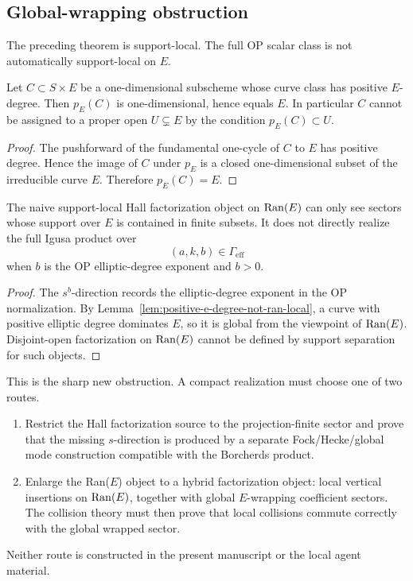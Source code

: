 \subsection{Global-wrapping obstruction}

The preceding theorem is support-local.  The full OP scalar class is not
automatically support-local on \(E\).

\begin{lemma}
\label{lem:positive-e-degree-not-ran-local}
Let \(C\subset S\times E\) be a one-dimensional subscheme whose curve
class has positive \(E\)-degree.  Then \(p_E(C)\) is one-dimensional,
hence equals \(E\).  In particular \(C\) cannot be assigned to a proper
open \(U\subsetneq E\) by the condition \(p_E(C)\subset U\).
\end{lemma}

\begin{proof}
The pushforward of the fundamental one-cycle of \(C\) to \(E\) has
positive degree.  Hence the image of \(C\) under \(p_E\) is a closed
one-dimensional subset of the irreducible curve \(E\).  Therefore
\(p_E(C)=E\).
\end{proof}

\begin{corollary}
\label{cor:ranE-misses-s-direction}
The naive support-local Hall factorization object on \(\operatorname{Ran}(E)\) can
only see sectors whose support over \(E\) is contained in finite
subsets.  It does not directly realize the full Igusa product over
\[
(a,k,b)\in\Gamma_{\mathrm{eff}}
\]
when \(b\) is the OP elliptic-degree exponent and \(b>0\).
\end{corollary}

\begin{proof}
The \(s^b\)-direction records the elliptic-degree exponent in the OP
normalization.  By Lemma~\ref{lem:positive-e-degree-not-ran-local}, a
curve with positive elliptic degree dominates \(E\), so it is global from
the viewpoint of \(\operatorname{Ran}(E)\).  Disjoint-open factorization on
\(\operatorname{Ran}(E)\) cannot be defined by support separation for such objects.
\end{proof}

This is the sharp new obstruction.  A compact realization must choose one
of two routes.
\begin{enumerate}
\item Restrict the Hall factorization source to the projection-finite
sector and prove that the missing \(s\)-direction is produced by a
separate Fock/Hecke/global mode construction compatible with the
Borcherds product.
\item Enlarge the Ran(\(E\)) object to a hybrid factorization object:
local vertical insertions on \(\operatorname{Ran}(E)\), together with global
\(E\)-wrapping coefficient sectors.  The collision theory must then prove
that local collisions commute correctly with the global wrapped sector.
\end{enumerate}
Neither route is constructed in the present manuscript or the local
agent material.

